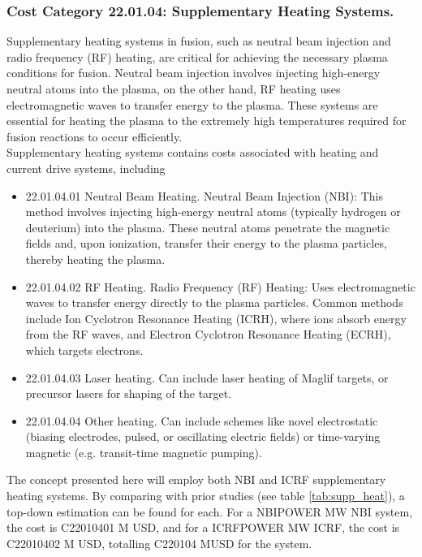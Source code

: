 \subsubsection*{Cost Category 22.01.04: Supplementary Heating Systems.}

Supplementary heating systems in fusion, such as neutral beam injection and radio frequency (RF) heating, are critical for achieving the necessary plasma conditions for fusion. Neutral beam injection involves injecting high-energy neutral atoms into the plasma, on the other hand, RF heating uses electromagnetic waves to transfer energy to the plasma. These systems are essential for heating the plasma to the extremely high temperatures required for fusion reactions to occur efficiently.\\

Supplementary heating systems contains costs associated with heating and current drive systems, including 

\begin{itemize}
    \item 22.01.04.01 Neutral Beam Heating.   Neutral Beam Injection (NBI): This method involves injecting high-energy neutral atoms (typically hydrogen or deuterium) into the plasma. These neutral atoms penetrate the magnetic fields and, upon ionization, transfer their energy to the plasma particles, thereby heating the plasma.
    \item 22.01.04.02 RF Heating.  Radio Frequency (RF) Heating: Uses electromagnetic waves to transfer energy directly to the plasma particles. Common methods include Ion Cyclotron Resonance Heating (ICRH), where ions absorb energy from the RF waves, and Electron Cyclotron Resonance Heating (ECRH), which targets electrons.
    \item 22.01.04.03 Laser heating.  Can include laser heating of Maglif targets, or precursor lasers for shaping of the target.
    \item 22.01.04.04 Other heating.  Can include schemes like novel electrostatic (biasing electrodes, pulsed, or oscillating electric fields) or time-varying magnetic (e.g. transit-time magnetic pumping).
\end{itemize}


The concept presented here will employ both NBI and ICRF supplementary heating systems. By comparing with prior studies (see table \ref{tab:supp_heat}), a top-down estimation can be found for each. For a NBIPOWER MW NBI system, the cost is C22010401 M USD, and for a ICRFPOWER MW ICRF, the cost is C22010402 M USD, totalling C220104 MUSD for the system.

